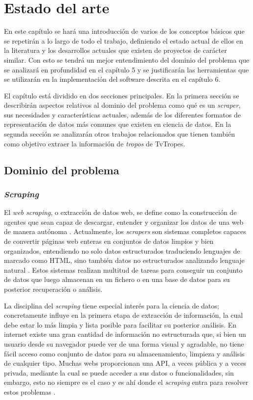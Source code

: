 \chapter{Estado del arte}

En este capítulo se hará una introducción de varios de los conceptos básicos que
se repetirán a lo largo de todo el trabajo, definiendo el estado actual de ellos
en la literatura y los desarrollos actuales que existen de proyectos de carácter
similar. Con esto se tendrá un mejor entendimiento del dominio del problema que
se analizará en profundidad en el capítulo 5 y se justificarán las herramientas
que se utilizarán en la implementación del software descrita en el capítulo 6.

El capítulo está dividido en dos secciones principales. En la primera sección se
describirán aspectos relativos al dominio del problema como qué es un
\textit{scraper}, sus necesidades y características actuales, además de los
diferentes formatos de representación de datos más comunes que existen en
ciencia de datos. En la segunda sección se analizarán otros trabajos
relacionados que tienen también como objetivo extraer la información de
\textit{tropos} de TvTropes. 

\section{Dominio del problema}
\subsection{\textit{Scraping}}

El \textit{web scraping}, o extracción de datos web, se define como la
construcción de agentes que sean capaz de descargar, entender y organizar los
datos de una web de manera autónoma \cite{apress2018scraping}. Actualmente, los
\textit{scrapers} son sistemas completos capaces de convertir páginas web
enteras en conjuntos de datos limpios y bien organizados, entendiendo no solo
datos estructurados traduciendo lenguajes de marcado como HTML, sino también
datos no estructurados analizando lenguaje natural \cite{zhao2017web}. Estos
sistemas realizan multitud de tareas para conseguir un conjunto de datos que
luego almacenan en un fichero o en una base de datos para su posterior
recuperación o análisis.

La disciplina del \textit{scraping} tiene especial interés para la ciencia de
datos; concretamente influye en la primera etapa de extracción de información,
la cual debe estar lo más limpia y lista posible para facilitar su posterior
análisis. En internet existe una gran cantidad de información no estructurada
que, si bien un usuario desde su navegador puede ver de una forma visual y
agradable, no tiene fácil acceso como conjunto de datos para su almacenamiento,
limpieza y análisis de cualquier tipo. Muchas webs proporcionan una API, a veces
pública y a veces privada, mediante la cual se puede acceder a sus datos o
funcionalidades, sin embargo, esto no siempre es el caso y es ahí donde el
\textit{scraping} entra para resolver estos problemas \cite{apress2018scraping}.


